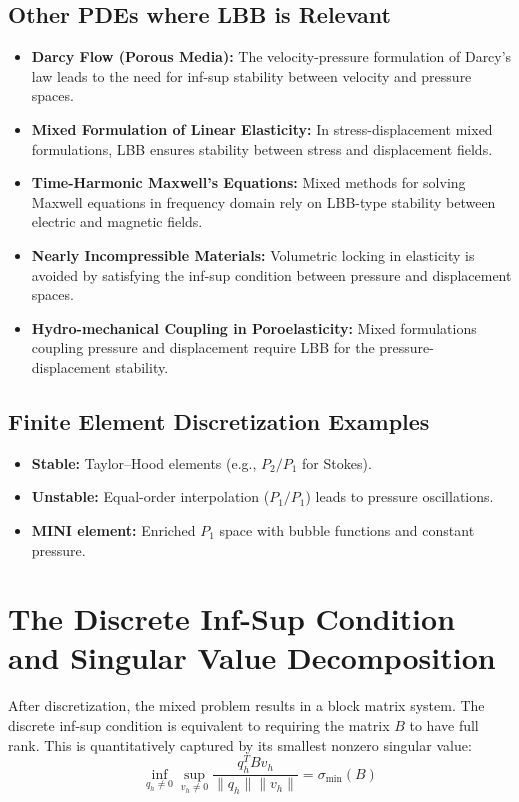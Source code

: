\documentclass[11pt]{article}
\begin{document}
\subsection{Other PDEs where LBB is Relevant}
\begin{itemize}[itemsep=0.5em]
  \item \textbf{Darcy Flow (Porous Media):} The velocity-pressure formulation of Darcy's law leads to the need for inf-sup stability between velocity and pressure spaces.
  \item \textbf{Mixed Formulation of Linear Elasticity:} In stress-displacement mixed formulations, LBB ensures stability between stress and displacement fields.
  \item \textbf{Time-Harmonic Maxwell's Equations:} Mixed methods for solving Maxwell equations in frequency domain rely on LBB-type stability between electric and magnetic fields.
  \item \textbf{Nearly Incompressible Materials:} Volumetric locking in elasticity is avoided by satisfying the inf-sup condition between pressure and displacement spaces.
  \item \textbf{Hydro-mechanical Coupling in Poroelasticity:} Mixed formulations coupling pressure and displacement require LBB for the pressure-displacement stability.
\end{itemize}

\subsection{Finite Element Discretization Examples}
\begin{itemize}[itemsep=0.5em]
  \item \textbf{Stable:} Taylor--Hood elements (e.g., $P_2/P_1$ for Stokes).
  \item \textbf{Unstable:} Equal-order interpolation ($P_1/P_1$) leads to pressure oscillations.
  \item \textbf{MINI element:} Enriched $P_1$ space with bubble functions and constant pressure.
\end{itemize}

\section{The Discrete Inf-Sup Condition and Singular Value Decomposition}
After discretization, the mixed problem results in a block matrix system. The discrete inf-sup condition is equivalent to requiring the matrix $B$ to have full rank. This is quantitatively captured by its smallest nonzero singular value:
\[ \inf_{q_h \ne 0} \sup_{v_h \ne 0} \frac{q_h^T B v_h}{\|q_h\|\|v_h\|} = \sigma_{\min}(B) \]
\end{document}
